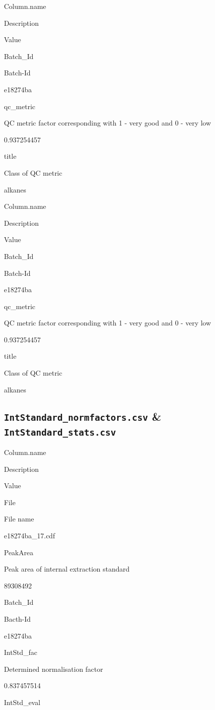 \documentclass[]{book}
\theoremstyle{definition}
\theoremstyle{definition}
\theoremstyle{definition}
\theoremstyle{remark}
\begin{document}
Column.name

Description

Value

Batch\_Id

Batch-Id

e18274ba

qc\_metric

QC metric factor corresponding with 1 - very good and 0 - very low

0.937254457

title

Class of QC metric

alkanes

Column.name

Description

Value

Batch\_Id

Batch-Id

e18274ba

qc\_metric

QC metric factor corresponding with 1 - very good and 0 - very low

0.937254457

title

Class of QC metric

alkanes

\subsection{\texorpdfstring{\texttt{IntStandard\_normfactors.csv} \&
\texttt{IntStandard\_stats.csv}}{IntStandard\_normfactors.csv \& IntStandard\_stats.csv}}\label{intstandard_normfactors.csv-intstandard_stats.csv}

Column.name

Description

Value

File

File name

e18274ba\_17.cdf

PeakArea

Peak area of internal extraction standard

89308492

Batch\_Id

Bacth-Id

e18274ba

IntStd\_fac

Determined normalisation factor

0.837457514

IntStd\_eval
\end{document}
